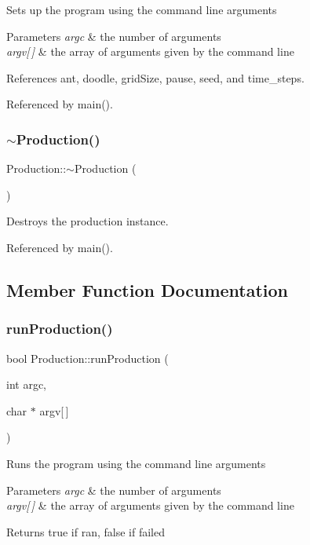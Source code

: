 Sets up the program using the command line arguments 
\begin{DoxyParams}{Parameters}
{\em argc} & the number of arguments \\
\hline
{\em argv\mbox{[}$\,$\mbox{]}} & the array of arguments given by the command line \\
\hline
\end{DoxyParams}


References ant, doodle, grid\+Size, pause, seed, and time\+\_\+steps.



Referenced by main().

\mbox{\label{classProduction_ab5b3060f9e0a2bc189844e426d693dab}} 
\subsubsection{$\sim$\+Production()}
{\footnotesize\ttfamily Production\+::$\sim$\+Production (\begin{DoxyParamCaption}{ }\end{DoxyParamCaption})\hspace{0.3cm}{\ttfamily [virtual]}}

Destroys the production instance. 

Referenced by main().



\subsection{Member Function Documentation}
\mbox{\label{classProduction_ac482b2e8ae736e706cfe01a123fc39ff}} 
\subsubsection{run\+Production()}
{\footnotesize\ttfamily bool Production\+::run\+Production (\begin{DoxyParamCaption}\item[{int}]{argc,  }\item[{char $\ast$}]{argv[$\,$] }\end{DoxyParamCaption})}

Runs the program using the command line arguments 
\begin{DoxyParams}{Parameters}
{\em argc} & the number of arguments \\
\hline
{\em argv\mbox{[}$\,$\mbox{]}} & the array of arguments given by the command line \\
\hline
\end{DoxyParams}
\begin{DoxyReturn}{Returns}
true if ran, false if failed 
\end{DoxyReturn}



